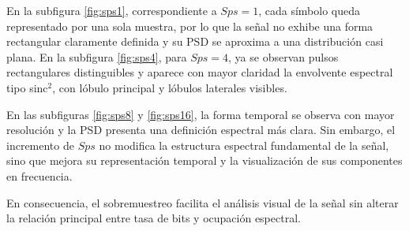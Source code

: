 En la subfigura \ref{fig:sps1}, correspondiente a \(Sps=1\), cada símbolo queda representado por una sola muestra, por lo que la señal no exhibe una forma rectangular claramente definida y su PSD se aproxima a una distribución casi plana. En la subfigura \ref{fig:sps4}, para \(Sps=4\), ya se observan pulsos rectangulares distinguibles y aparece con mayor claridad la envolvente espectral tipo sinc\(^2\), con lóbulo principal y lóbulos laterales visibles.

En las subfiguras \ref{fig:sps8} y \ref{fig:sps16}, la forma temporal se observa con mayor resolución y la PSD presenta una definición espectral más clara. Sin embargo, el incremento de \(Sps\) no modifica la estructura espectral fundamental de la señal, sino que mejora su representación temporal y la visualización de sus componentes en frecuencia.

En consecuencia, el sobremuestreo facilita el análisis visual de la señal sin alterar la relación principal entre tasa de bits y ocupación espectral.
\FloatBarrier